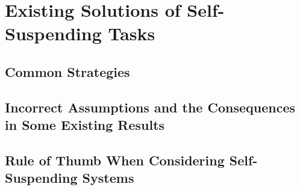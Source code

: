 \section{Existing Solutions of Self-Suspending Tasks}

\subsection{Common Strategies}
\subsection{Incorrect Assumptions and the Consequences in Some Existing Results}
\subsection{Rule of Thumb When Considering Self-Suspending Systems}